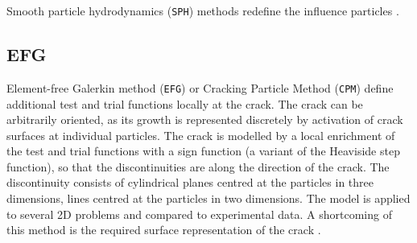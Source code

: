 \documentclass[format=acmsmall, 12pt, screen=true, review=false]{acmart}
\begin{document}
Smooth particle hydrodynamics (\texttt{SPH}) \cite{Moh17, Moh18} methods redefine the influence particles \cite{Mun13}.

\subsection{EFG}

Element-free Galerkin method (\texttt{EFG}) or Cracking Particle Method (\texttt{CPM})  \cite{Pel16, Fle96, Rab04, Rab07, Rab10}
define additional test and trial functions locally at the crack. The crack can be arbitrarily oriented, as its growth is represented discretely by activation of crack surfaces at individual particles. The crack is modelled by a local enrichment of the test and trial functions with a sign function (a variant of the Heaviside step function), so that the discontinuities are along the direction of the crack. The discontinuity consists of cylindrical planes centred at the particles in three dimensions, lines centred at the particles in two dimensions. The model is applied to several 2D problems and compared to experimental data. A shortcoming of this method is the required surface representation of the crack \cite{Rab04}.
\end{document}
